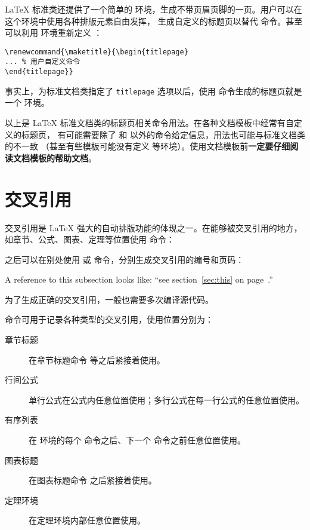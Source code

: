 \LaTeX{} 标准类还提供了一个简单的  环境，生成不带页眉页脚的一页。用户可以在这个环境中使用各种排版元素自由发挥，
生成自定义的标题页以替代  命令。甚至可以利用  环境重新定义 ：
\begin{verbatim}
\renewcommand{\maketitle}{\begin{titlepage}
... % 用户自定义命令
\end{titlepage}}
\end{verbatim}

事实上，为标准文档类指定了 \texttt{titlepage} 选项以后，使用  命令生成的标题页就是一个  环境。

以上是 \LaTeX{} 标准文档类的标题页相关命令用法。在各种文档模板中经常有自定义的标题页，
有可能需要除了  和  以外的命令给定信息，用法也可能与标准文档类的不一致
（甚至有些模板可能没有定义  等环境）。使用文档模板前\textbf{一定要仔细阅读文档模板的帮助文档}。

\section{交叉引用}\label{sec:crossref}

交叉引用是 \LaTeX{} 强大的自动排版功能的体现之一。在能够被交叉引用的地方，如章节、公式、图表、定理等位置使用  命令：
\begin{command}
\end{command}

之后可以在别处使用  或  命令，分别生成交叉引用的编号和页码：
\begin{command}
 \quad
{}
\end{command}
\begin{example}
A reference to this subsection
\label{sec:this} looks like:
``see section~\ref{sec:this} on
page~\pageref{sec:this}.''
\end{example}

为了生成正确的交叉引用，一般也需要多次编译源代码。

 命令可用于记录各种类型的交叉引用，使用位置分别为：
\begin{description}
  \item[章节标题] 在章节标题命令  等之后紧接着使用。
  \item[行间公式] 单行公式在公式内任意位置使用；多行公式在每一行公式的任意位置使用。
  \item[有序列表] 在  环境的每个  命令之后、下一个  命令之前任意位置使用。
  \item[图表标题] 在图表标题命令  之后紧接着使用。
  \item[定理环境] 在定理环境内部任意位置使用。
\end{description}

